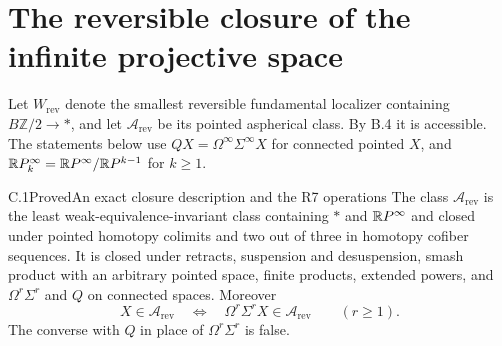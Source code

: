 \section{The reversible closure of the infinite projective space}

Let $W_{\mathrm{rev}}$ denote the smallest reversible fundamental localizer containing $B\mathbb Z/2\to *$, and let $\mathcal A_{\mathrm{rev}}$ be its pointed aspherical class. By B.4 it is accessible. The statements below use $QX=\Omega^\infty\Sigma^\infty X$ for connected pointed $X$, and $\mathbb{R}P^\infty_k=\mathbb{R}P^\infty/\mathbb{R}P^{k-1}$ for $k\geq1$.

\begin{claim}{C.1}{Proved}{An exact closure description and the R7 operations}
The class $\mathcal A_{\mathrm{rev}}$ is the least weak-equivalence-invariant class containing $*$ and $\mathbb{R}P^\infty$ and closed under pointed homotopy colimits and two out of three in homotopy cofiber sequences. It is closed under retracts, suspension and desuspension, smash product with an arbitrary pointed space, finite products, extended powers, and $\Omega^r\Sigma^r$ and $Q$ on connected spaces. Moreover
\[
 X\in\mathcal A_{\mathrm{rev}}
 \quad\Longleftrightarrow\quad
 \Omega^r\Sigma^rX\in\mathcal A_{\mathrm{rev}}
 \qquad(r\geq1).
\]
The converse with $Q$ in place of $\Omega^r\Sigma^r$ is false.
\end{claim}
